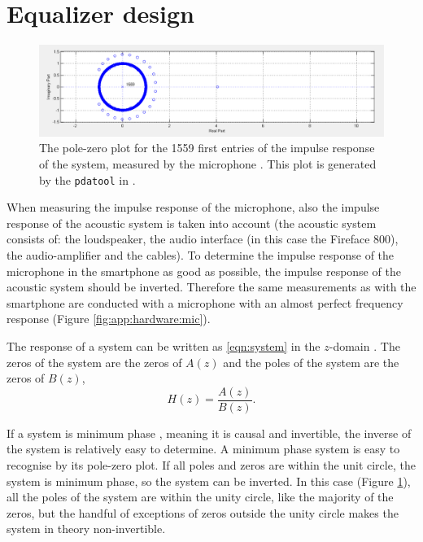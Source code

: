 \section{Equalizer design}
\label{sec:eq-design}
\begin{figure}[b!]
    \centering
    \includegraphics[width=\textwidth]{afbeeldingen/polezero.png}
    \caption[Pole-zero plot impulse response acoustic system]{The pole-zero plot for the 1559 first entries of the impulse response of the system, measured by the microphone \cite{manual:microphone}. This plot is generated by the \texttt{pdatool} in \matlab.}
    \label{fig:polezero}
\end{figure}
When measuring the impulse response of the microphone, also the impulse response of the acoustic system is taken into account (the acoustic system consists of: the loudspeaker, the audio interface (in this case the Fireface 800), the audio-amplifier and the cables).
To determine the impulse response of the microphone in the smartphone as good as possible, the impulse response of the acoustic system should be inverted.
Therefore the same measurements as with the smartphone are conducted with a microphone \cite{manual:microphone} with an almost perfect frequency response (Figure \ref{fig:app:hardware:mic}).

The response of a system can be written as \eqref{eqn:system} in the $z$-domain \cite[eq.~(5.4.6)]{book:dsp}. 
The zeros of the system are the zeros of $A(z)$ and the poles of the system are the zeros of $B(z)$,
\begin{equation}
\label{eqn:system}
H(z)=\dfrac{A(z)}{B(z)}.
\end{equation}

If a system is minimum phase \cite[p.~331-337]{book:dsp}, meaning it is causal and invertible, the inverse of the system is relatively easy to determine.
A minimum phase system is easy to recognise by its pole-zero plot.
If all poles and zeros are within the unit circle, the system is minimum phase, so the system can be inverted.
In this case (Figure \ref{fig:polezero}), all the poles of the system are within the unity circle, like the majority of the zeros, but the handful of exceptions of zeros outside the unity circle makes the system in theory non-invertible.

